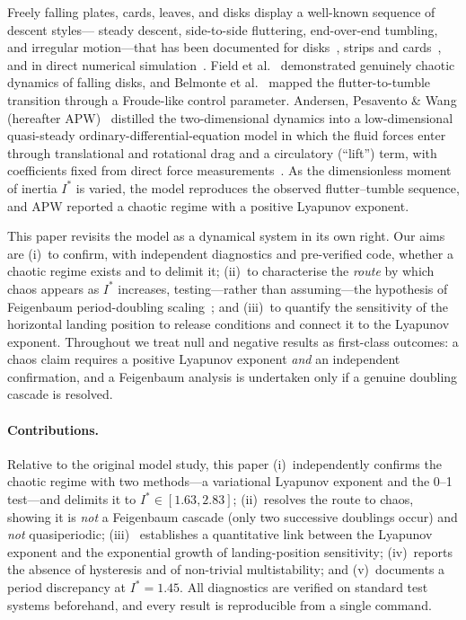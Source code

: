 \documentclass[11pt]{article}
\newcommand{\Is}{I^{*}}          %
\begin{document}
Freely falling plates, cards, leaves, and disks display a well-known sequence of descent styles---
steady descent, side-to-side fluttering, end-over-end tumbling, and irregular motion---that has been
documented for disks~\cite{willmarth64,field97}, strips and cards~\cite{belmonte98,mahadevan99}, and
in direct numerical simulation~\cite{pw04}. Field et al.~\cite{field97} demonstrated genuinely
chaotic dynamics of falling disks, and Belmonte et al.~\cite{belmonte98} mapped the flutter-to-tumble
transition through a Froude-like control parameter. Andersen, Pesavento \& Wang (hereafter
APW)~\cite{apw91,apw65} distilled the two-dimensional dynamics into a low-dimensional quasi-steady
ordinary-differential-equation model in which the fluid forces enter through translational and
rotational drag and a circulatory (``lift'') term, with coefficients fixed from direct force
measurements~\cite{wbd04}. As the dimensionless moment of inertia $\Is$ is varied, the model
reproduces the observed flutter--tumble sequence, and APW reported a chaotic regime with a positive
Lyapunov exponent.

This paper revisits the model as a dynamical system in its own right. Our aims are (i)~to confirm,
with independent diagnostics and pre-verified code, whether a chaotic regime exists and to delimit it;
(ii)~to characterise the \emph{route} by which chaos appears as $\Is$ increases, testing---rather than
assuming---the hypothesis of Feigenbaum period-doubling scaling~\cite{feigenbaum78}; and (iii)~to
quantify the sensitivity of the horizontal landing position to release conditions and connect it to
the Lyapunov exponent. Throughout we treat null and negative results as first-class outcomes: a chaos
claim requires a positive Lyapunov exponent \emph{and} an independent confirmation, and a Feigenbaum
analysis is undertaken only if a genuine doubling cascade is resolved.

\paragraph{Contributions.} Relative to the original model study, this paper (i)~independently confirms
the chaotic regime with two methods---a variational Lyapunov exponent and the 0--1 test---and
delimits it to $\Is\in[1.63,2.83]$; (ii)~resolves the route to chaos, showing it is \emph{not} a
Feigenbaum cascade (only two successive doublings occur) and \emph{not} quasiperiodic; (iii)~
establishes a quantitative link between the Lyapunov exponent and the exponential growth of
landing-position sensitivity; (iv)~reports the absence of hysteresis and of non-trivial
multistability; and (v)~documents a period discrepancy at $\Is=1.45$. All diagnostics are verified on
standard test systems beforehand, and every result is reproducible from a single command.
\end{document}
